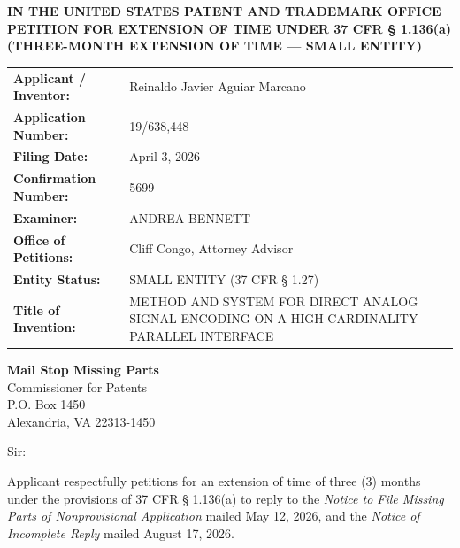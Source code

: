 \documentclass[11pt,letterpaper]{article}
\begin{document}
\thispagestyle{empty}

\begin{center}
    \textbf{\large IN THE UNITED STATES PATENT AND TRADEMARK OFFICE} \\
    \vspace{0.3cm}
    \textbf{\large PETITION FOR EXTENSION OF TIME UNDER 37 CFR \S{} 1.136(a)} \\
    \textbf{\normalsize (THREE-MONTH EXTENSION OF TIME --- SMALL ENTITY)}
\end{center}

\vspace{0.4cm}
\noindent\begin{tabular}{p{2.3in}p{4.0in}}
\textbf{Applicant / Inventor:} & Reinaldo Javier Aguiar Marcano \\
\textbf{Application Number:} & 19/638,448 \\
\textbf{Filing Date:} & April 3, 2026 \\
\textbf{Confirmation Number:} & 5699 \\
\textbf{Examiner:} & ANDREA BENNETT \\
\textbf{Office of Petitions:} & Cliff Congo, Attorney Advisor \\
\textbf{Entity Status:} & SMALL ENTITY (37 CFR \S{} 1.27) \\
\textbf{Title of Invention:} & METHOD AND SYSTEM FOR DIRECT ANALOG SIGNAL ENCODING ON A HIGH-CARDINALITY PARALLEL INTERFACE \\
\end{tabular}

\vspace{0.5cm}
\noindent\textbf{Mail Stop Missing Parts} \\
Commissioner for Patents \\
P.O. Box 1450 \\
Alexandria, VA 22313-1450

\vspace{0.2cm}
Sir:

Applicant respectfully petitions for an extension of time of three (3) months under the provisions of 37 CFR \S{} 1.136(a) to reply to the \textit{Notice to File Missing Parts of Nonprovisional Application} mailed May 12, 2026, and the \textit{Notice of Incomplete Reply} mailed August 17, 2026.
\end{document}
